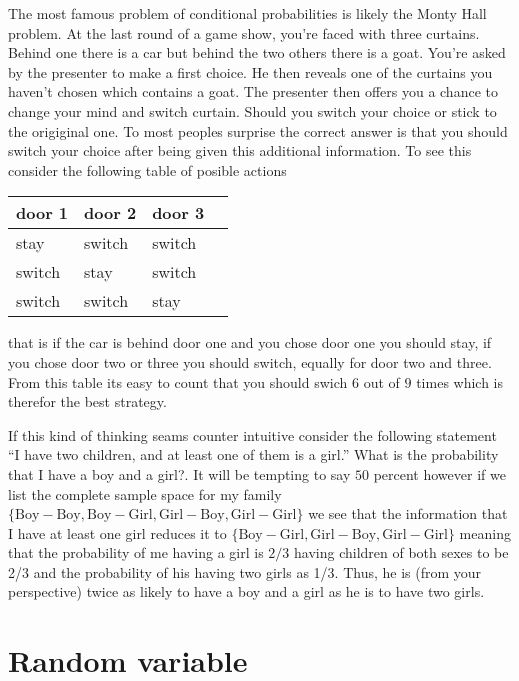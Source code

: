 \myindent The most famous problem of conditional probabilities is likely the Monty Hall problem. At the last round of a game show, you’re faced with three curtains. Behind one there is a car but behind the two others there is a goat. You’re asked by the presenter to make a first choice. He then reveals one of the curtains you haven’t chosen which contains a goat. The presenter then offers you a chance to change your mind and switch curtain. Should you switch your choice or stick to the origiginal one. To most peoples surprise the correct answer is that you should switch your choice after being given this additional information. To see this consider the following table of posible actions
\begin{table}[H]
\centering
\begin{tabular}{|l|l|l|l|}
\hline
\textbf{door 1} & \textbf{door 2} & \textbf{door 3} \\ \hline
stay            & switch          & switch          \\ \hline
switch          & stay            & switch          \\ \hline
switch          & switch          & stay            \\ \hline
\end{tabular}
\end{table}
that is if the car is behind door one and you chose door one you should stay, if you chose door two or three you should switch, equally for door two and three. From this table its easy to count that you should swich $6$ out of $9$ times which is therefor the best strategy.

If this kind of thinking seams counter intuitive consider the following statement “I have two children, and at least one of them is a girl.” What is the probability that I have a boy and a girl?. It will be tempting to say $50$ percent however if we list the complete sample space for my family $\{\text{Boy}-\text{Boy}, \text{Boy}-\text{Girl}, \text{Girl}-\text{Boy}, \text{Girl}-\text{Girl}\}$ we see that the information that I have at least one girl reduces it to $\{\text{Boy}-\text{Girl}, \text{Girl}-\text{Boy}, \text{Girl}-\text{Girl}\}$ meaning that the probability of me having a girl is $2/3$  having children of both sexes to be 2/3 and the probability of his having two girls as 1/3. Thus, he is (from your perspective) twice as likely to have a boy and a girl as he is to have two girls.

\section{Random variable}
